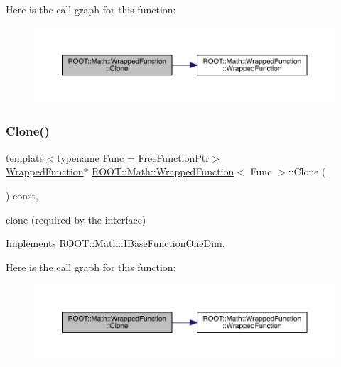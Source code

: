 Here is the call graph for this function\+:
\nopagebreak
\begin{figure}[H]
\begin{center}
\leavevmode
\includegraphics[width=350pt]{de/d34/classROOT_1_1Math_1_1WrappedFunction_a4ec89f0c717b0fc228ebe7d71e14b1ee_cgraph}
\end{center}
\end{figure}
\mbox{\label{classROOT_1_1Math_1_1WrappedFunction_a4ec89f0c717b0fc228ebe7d71e14b1ee}} 
\subsubsection{\texorpdfstring{Clone()}{Clone()}\hspace{0.1cm}{\footnotesize\ttfamily [3/3]}}
{\footnotesize\ttfamily template$<$typename Func  = Free\+Function\+Ptr$>$ \\
\mbox{\hyperlink{classROOT_1_1Math_1_1WrappedFunction}{Wrapped\+Function}}$\ast$ \mbox{\hyperlink{classROOT_1_1Math_1_1WrappedFunction}{R\+O\+O\+T\+::\+Math\+::\+Wrapped\+Function}}$<$ Func $>$\+::Clone (\begin{DoxyParamCaption}{ }\end{DoxyParamCaption}) const\hspace{0.3cm}{\ttfamily [inline]}, {\ttfamily [virtual]}}



clone (required by the interface) 



Implements \mbox{\hyperlink{classROOT_1_1Math_1_1IBaseFunctionOneDim_a656dbb4dfc43e8d1566442bfb1a717fd}{R\+O\+O\+T\+::\+Math\+::\+I\+Base\+Function\+One\+Dim}}.

Here is the call graph for this function\+:
\nopagebreak
\begin{figure}[H]
\begin{center}
\leavevmode
\includegraphics[width=350pt]{de/d34/classROOT_1_1Math_1_1WrappedFunction_a4ec89f0c717b0fc228ebe7d71e14b1ee_cgraph}
\end{center}
\end{figure}


